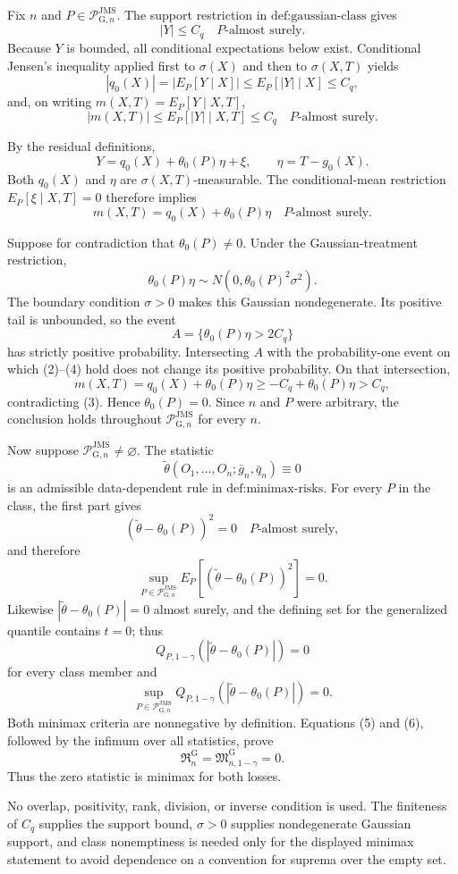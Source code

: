 Fix \(n\) and \(P\in\mathcal P_{\mathrm G,n}^{\mathrm{JMS}}\).  The support restriction in \(\text{def:gaussian-class}\) gives
\[
 |Y|\le C_q
 \quad P\text{-almost surely}. \tag{1}
\]
Because \(Y\) is bounded, all conditional expectations below exist.  Conditional Jensen's inequality applied first to \(\sigma(X)\) and then to \(\sigma(X,T)\) yields
\[
 |q_0(X)|
 =|E_P[Y\mid X]|
 \le E_P[|Y|\mid X]
 \le C_q, \tag{2}
\]
and, on writing \(m(X,T)=E_P[Y\mid X,T]\),
\[
 |m(X,T)|
 \le E_P[|Y|\mid X,T]
 \le C_q
 \quad P\text{-almost surely}. \tag{3}
\]

By the residual definitions,
\[
 Y=q_0(X)+\theta_0(P)\eta+\xi,
 \qquad
 \eta=T-g_0(X).
\]
Both \(q_0(X)\) and \(\eta\) are \(\sigma(X,T)\)-measurable.  The conditional-mean restriction \(E_P[\xi\mid X,T]=0\) therefore implies
\[
 m(X,T)=q_0(X)+\theta_0(P)\eta
 \quad P\text{-almost surely}. \tag{4}
\]

Suppose for contradiction that \(\theta_0(P)\ne0\).  Under the Gaussian-treatment restriction,
\[
 \theta_0(P)\eta
 \sim N\!\left(0,\theta_0(P)^2\sigma^2\right).
\]
The boundary condition \(\sigma>0\) makes this Gaussian nondegenerate.  Its positive tail is unbounded, so the event
\[
 A=\{\theta_0(P)\eta>2C_q\}
\]
has strictly positive probability.  Intersecting \(A\) with the probability-one event on which (2)--(4) hold does not change its positive probability.  On that intersection,
\[
 m(X,T)
 =q_0(X)+\theta_0(P)\eta
 \ge -C_q+\theta_0(P)\eta
 >C_q,
\]
contradicting (3).  Hence \(\theta_0(P)=0\).  Since \(n\) and \(P\) were arbitrary, the conclusion holds throughout \(\mathcal P_{\mathrm G,n}^{\mathrm{JMS}}\) for every \(n\).

Now suppose \(\mathcal P_{\mathrm G,n}^{\mathrm{JMS}}\ne\varnothing\).  The statistic
\[
 \widetilde\theta(O_1,\ldots,O_n;\bar g_n,\bar q_n)\equiv0
\]
is an admissible data-dependent rule in \(\text{def:minimax-risks}\).  For every \(P\) in the class, the first part gives
\[
 (\widetilde\theta-\theta_0(P))^2=0
 \quad P\text{-almost surely},
\]
and therefore
\[
 \sup_{P\in\mathcal P_{\mathrm G,n}^{\mathrm{JMS}}}
 E_P[(\widetilde\theta-\theta_0(P))^2]=0. \tag{5}
\]
Likewise \(|\widetilde\theta-\theta_0(P)|=0\) almost surely, and the defining set for the generalized quantile contains \(t=0\); thus
\[
 Q_{P,1-\gamma}(|\widetilde\theta-\theta_0(P)|)=0
\]
for every class member and
\[
 \sup_{P\in\mathcal P_{\mathrm G,n}^{\mathrm{JMS}}}
 Q_{P,1-\gamma}(|\widetilde\theta-\theta_0(P)|)=0. \tag{6}
\]
Both minimax criteria are nonnegative by definition.  Equations (5) and (6), followed by the infimum over all statistics, prove
\[
 \mathfrak R_n^{\mathrm G}
 =\mathfrak M_{n,1-\gamma}^{\mathrm G}
 =0.
\]
Thus the zero statistic is minimax for both losses.

No overlap, positivity, rank, division, or inverse condition is used.  The finiteness of \(C_q\) supplies the support bound, \(\sigma>0\) supplies nondegenerate Gaussian support, and class nonemptiness is needed only for the displayed minimax statement to avoid dependence on a convention for suprema over the empty set.
